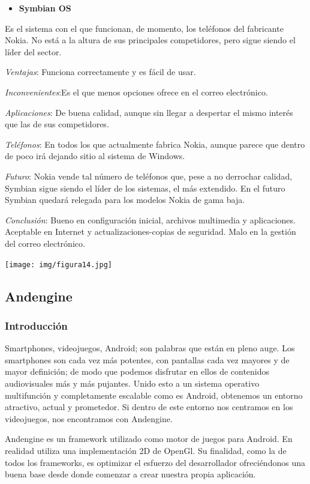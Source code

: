 \documentclass[12 pt, a4paper, twoside]{article}
\begin{document}
\begin{itemize}
\item \textbf{Symbian OS}
\end{itemize}

Es el sistema con el que funcionan, de momento, los teléfonos del
fabricante Nokia. No está a la altura de sus principales competidores,
pero sigue siendo el líder del sector.

\emph{Ventajas}: Funciona correctamente y es fácil de usar.

\emph{Inconvenientes}:Es el que menos opciones ofrece en el correo
electrónico.

\emph{Aplicaciones}: De buena calidad, aunque sin llegar a despertar
el mismo interés que las de sus competidores.

\emph{Teléfonos}: En todos los que actualmente fabrica Nokia, aunque
parece que dentro de poco irá dejando sitio al sistema de Windows.

\emph{Futuro}: Nokia vende tal número de teléfonos que, pese a no
derrochar calidad, Symbian sigue siendo el líder de los sistemas, el
más extendido. En el futuro Symbian quedará relegada para los modelos
Nokia de gama baja.

\emph{Conclusión}: Bueno en configuración inicial, archivos multimedia
y aplicaciones. Aceptable en Internet y actualizaciones-copias de
seguridad. Malo en la gestión del correo electrónico.

\begin{center}
  \texttt{[image: img/figura14.jpg]}
\end{center}

\newpage
\subsection{Andengine}
\subsubsection{Introducción}
Smartphones, videojuegos, Android; son palabras que están en pleno
auge. Los smartphones son cada vez más potentes, con pantallas cada
vez mayores y de mayor definición; de modo que podemos disfrutar en
ellos de contenidos audiovisuales más y más pujantes. Unido esto a
un sistema operativo multifunción y completamente escalable como es
Android, obtenemos un entorno atractivo, actual y prometedor. Si
dentro de este entorno nos centramos en los videojuegos, nos
encontramos con Andengine.

Andengine es un framework utilizado como motor de juegos para Android. En
realidad utiliza una implementación 2D de OpenGl. Su
finalidad, como la de todos los frameworks, es optimizar el
esfuerzo del desarrollador ofreciéndonos una buena base desde donde
comenzar a crear nuestra propia aplicación.
\end{document}
